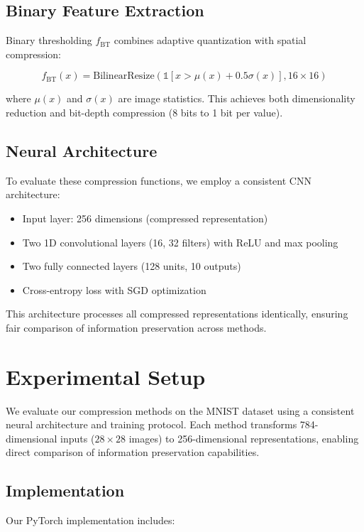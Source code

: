 \documentclass{article} %
\begin{document}
\subsection{Binary Feature Extraction}
Binary thresholding $f_{\text{BT}}$ combines adaptive quantization with spatial compression:

\begin{equation}
    f_{\text{BT}}(x) = \text{BilinearResize}(\mathbb{1}[x > \mu(x) + 0.5\sigma(x)], 16 \times 16)
\end{equation}

where $\mu(x)$ and $\sigma(x)$ are image statistics. This achieves both dimensionality reduction and bit-depth compression (8 bits to 1 bit per value).

\subsection{Neural Architecture}
To evaluate these compression functions, we employ a consistent CNN architecture:
\begin{itemize}
    \item Input layer: 256 dimensions (compressed representation)
    \item Two 1D convolutional layers (16, 32 filters) with ReLU and max pooling
    \item Two fully connected layers (128 units, 10 outputs)
    \item Cross-entropy loss with SGD optimization
\end{itemize}

This architecture processes all compressed representations identically, ensuring fair comparison of information preservation across methods.

\section{Experimental Setup}
\label{sec:experimental}

We evaluate our compression methods on the MNIST dataset using a consistent neural architecture and training protocol. Each method transforms 784-dimensional inputs ($28 \times 28$ images) to 256-dimensional representations, enabling direct comparison of information preservation capabilities.

\subsection{Implementation}
Our PyTorch implementation includes:
\end{document}

